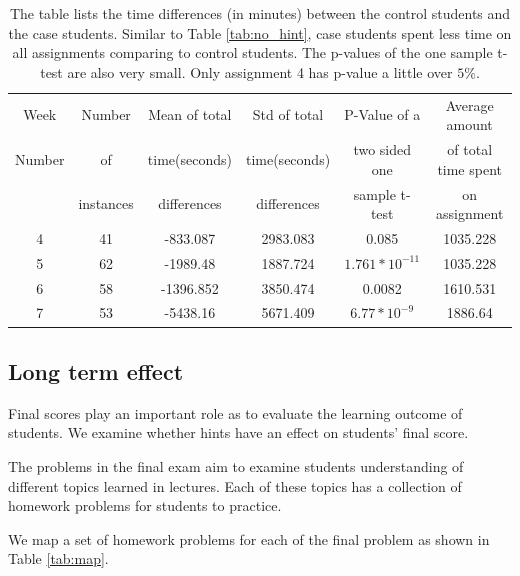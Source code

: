 \documentclass{llncs2e/llncs}
\begin{document}
\begin{table}
\caption{The table lists the time differences (in minutes) between the control students and the case students. Similar to Table \ref{tab:no_hint}, case students spent less time on all assignments comparing to control students. The p-values of the one sample t-test are also very small. Only assignment 4 has p-value a little over $5\%$.}
\begin{center}
  \begin{tabular}{| c | c | c | c | c | c |}
    \hline
    Week & Number& Mean of total & Std of total &  P-Value of a &Average amount \\
    Number & of & time(seconds) & time(seconds) & two sided one & of total time spent\\
     & instances & differences & differences & sample t-test & on assignment   \\ \hline
	4 & 41 & -833.087 & 2983.083 & 0.085 & 1035.228\\
	5 & 62 & -1989.48 &1887.724 & $1.761 * 10^{-11}$ & 1035.228\\
	6 & 58 & -1396.852 & 3850.474 & 0.0082 & 1610.531 \\
	7 & 53 & -5438.16 & 5671.409 & $6.77 * 10^{-9}$ & 1886.64\\
	\hline
  \end{tabular}
  \label{tab:no_hint_time}
  \end{center}
\end{table}



\subsection{Long term effect}
Final scores play an important role as to evaluate the learning outcome of students. We examine whether hints have an effect on students' final score.

The problems in the final exam aim to examine students understanding of different topics learned in lectures. Each of these topics has a collection of homework problems for students to practice.

\iffalse
We map a set of homework problems for each of the final problem as shown in Table \ref{tab:map}.
\end{document}
